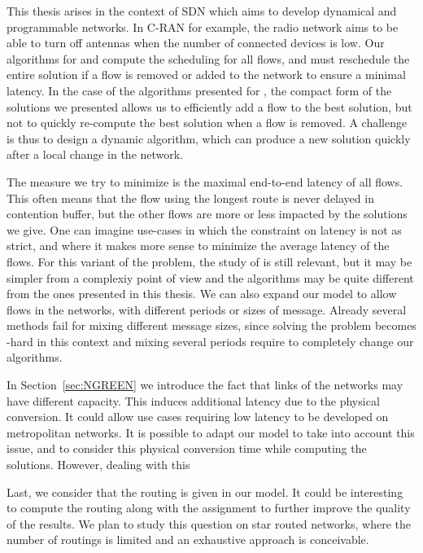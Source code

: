 This thesis arises in the context of SDN which aims to develop dynamical and programmable networks. In C-RAN for example, the radio network aims to be able to turn off antennas when the number of connected devices is low. Our algorithms for \pazl and \pall compute the scheduling for all flows, and must reschedule the entire solution if a flow is removed or added to the network to ensure a minimal latency. In the case of the algorithms presented for \minstra, the compact form of the solutions we presented allows us to efficiently add a flow to the best solution, but not to quickly re-compute the best solution when a flow is removed. A challenge is thus to design a dynamic algorithm, which can produce a new solution quickly after 
a local change in the network.

The measure we try to minimize is the maximal end-to-end latency of all flows. This often means that the flow using the longest route is never delayed in contention buffer, but the other flows are more or less impacted by the solutions we give. One can imagine use-cases in which the constraint on latency is not as strict, and where it makes more sense
to minimize the average latency of the flows. For this variant of the problem, the study of \pazl is still relevant, but it may be simpler from a complexiy point of view
and the algorithms may be quite different from the ones presented in this thesis.
 We can also expand our model to allow flows in the networks, with different periods or sizes of message. Already several methods fail for mixing different message sizes, 
 since solving the problem \wta becomes \NP-hard in this context and mixing several periods require to completely change our algorithms.

In Section~\ref{sec:NGREEN} we introduce the fact that links of the networks may have different capacity. This induces additional latency due to the physical conversion. It could allow use cases requiring low latency to be developed on metropolitan networks. It is possible to adapt our model to take into account this issue, and to consider this physical conversion time while computing the solutions. However, dealing with this 

Last, we consider that the routing is given in our model. It could be interesting to compute the routing 
along with the assignment to further improve the quality of the results. We plan to study this question on star routed networks, where the number of 
routings is limited and an exhaustive approach is conceivable. 
